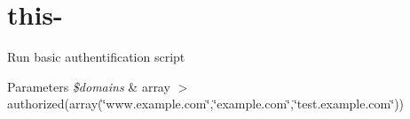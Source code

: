 \hypertarget{this--example}{\section{this-\/}
}
Run basic authentification script 
\begin{DoxyParams}{Parameters}
{\em \$domains} & array $>$authorized(array(\char`\"{}www.\-example.\-com\char`\"{},\char`\"{}example.\-com\char`\"{},\char`\"{}test.\-example.\-com\char`\"{}))\\
\hline
\end{DoxyParams}

\begin{DoxyCodeInclude}
\end{DoxyCodeInclude}
 